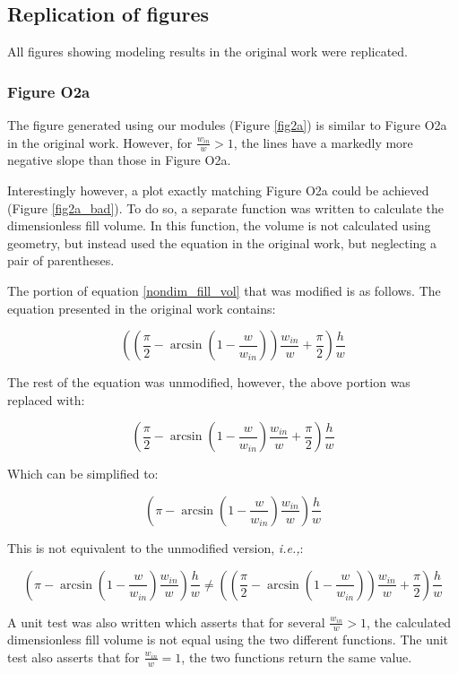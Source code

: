 \subsection{Replication of figures}

All figures showing modeling results in the original work were replicated. 

\subsubsection{Figure O2a}

The figure generated using our modules (Figure \ref{fig2a}) is similar to
Figure O2a in the original work. However, for $\frac{w_{in}}{w}>1$, the
lines have a markedly more negative slope than those in Figure O2a.

Interestingly however, a plot exactly matching Figure O2a could be achieved
(Figure \ref{fig2a_bad}). To do so,
a separate function was written to calculate the dimensionless fill volume. In this function,
the volume is not calculated using geometry, but instead used the equation in the original work,
but neglecting a pair of parentheses.

The portion of equation \eqref{nondim_fill_vol} that was modified is as follows.
The equation presented in the original work contains:

$$
\left(\left(\frac{\pi}{2} -
\arcsin\left(1 - \frac{w}{w_{in}}\right)\right)\frac{w_{in}}{w} +
\frac{\pi}{2}\right)\frac{h}{w}
$$

\noindent The rest of the equation was unmodified, however, the above portion was replaced with:

$$
\left(\frac{\pi}{2} -
\arcsin\left(1 - \frac{w}{w_{in}}\right)\frac{w_{in}}{w} +
\frac{\pi}{2}\right)\frac{h}{w}
$$

\noindent Which can be simplified to:

$$
\left(\pi -
\arcsin\left(1 - \frac{w}{w_{in}}\right)\frac{w_{in}}{w}
\right)\frac{h}{w}
$$

\noindent This is not equivalent to the unmodified version, \emph{i.e.,}:

$$
\left(\pi -
\arcsin\left(1 - \frac{w}{w_{in}}\right)\frac{w_{in}}{w}
\right)\frac{h}{w}
\neq
\left(\left(\frac{\pi}{2} -
\arcsin\left(1 - \frac{w}{w_{in}}\right)\right)\frac{w_{in}}{w} +
\frac{\pi}{2}\right)\frac{h}{w}
$$

\noindent A unit test was also written which asserts that for several $\frac{w_{in}}{w}>1$, the 
calculated dimensionless fill volume is not equal using the two different functions.
The unit test also asserts that for $\frac{w_{in}}{w}=1$, the two functions return
the same value.

